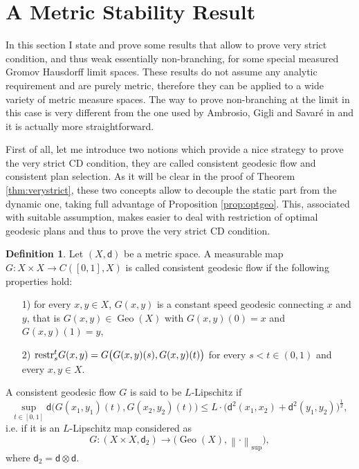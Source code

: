 \documentclass[11pt,twoside,a4paper]{article}
\newcommand{\norm}[1]{\left\lVert#1\right\rVert}
\newcommand{\rest}[2]{{{\rm restr}_{#1}^{#2}}}
\newcommand{\di}{\mathsf d} %
\DeclareMathOperator{\Geo}{Geo}
\theoremstyle{theorem}
\theoremstyle{definition}
\newtheorem{definition}[theorem]{Definition}
\theoremstyle{remark}
\theoremstyle{proof}
\begin{document}
\section{A Metric Stability Result}\label{section:ametricstabilityresult}

In this section I state and prove some results that allow to prove very strict condition, and thus weak essentially non-branching, for some special measured Gromov Hausdorff limit spaces. These results do not assume any analytic requirement and are purely metric, therefore they can be applied to a wide variety of metric measure spaces. The way to prove non-branching at the limit in this case is very different from the one used by Ambrosio, Gigli and Savaré in \cite{Ambrosio_2014} and it is actually more straightforward.

First of all, let me introduce two notions which provide a nice strategy to prove the very strict CD condition, they are called consistent geodesic flow and consistent plan selection. As it will be clear in the proof of Theorem \ref{thm:verystrict}, these two concepts allow to decouple the static part from the dynamic one, taking full advantage of Proposition \ref{prop:optgeo}. This, associated with suitable assumption, makes easier to deal with restriction of optimal geodesic plans and thus to prove the very strict CD condition.

\begin{definition}\label{def:nicegeodesicflow}
Let $(X,\di)$ be a metric space. A measurable map $G:X\times X\to C([0,1],X)$ is called consistent geodesic flow if the following properties hold:
\begin{itemize}
    \item[1)] for every $x,y\in X$, $G(x,y)$ is a constant speed geodesic connecting $x$ and $y$, that is $G(x,y)\in \Geo (X)$ with $G(x,y)(0)=x$ and $G(x,y)(1)=y$,  
    \item[2)] $\rest{s}{t} G(x,y) = G\big(G(x,y)(s),G(x,y)(t)\big)$ for every $s<t\in (0,1)$ and every $x,y\in X$.
\end{itemize}
A consistent geodesic flow $G$ is said to be $L$-Lipschitz if 
\begin{equation*}
  \sup_{t\in [0,1]}   \di \big(G(x_1,y_1)(t), G(x_2,y_2)(t)\big)  \leq L \cdot \big( \di^2 (x_1,x_2) + \di^2 (y_1,y_2)\big)^\frac12,
\end{equation*}
 i.e. if it is an $L$-Lipschitz map considered as 
 \begin{equation*}
     G: (X\times X, \di_2) \to \big(\Geo (X), \norm{\cdot}_\text{sup} \big),
 \end{equation*}
where $\di_2=\di \otimes \di$.
\end{definition}
\end{document}
